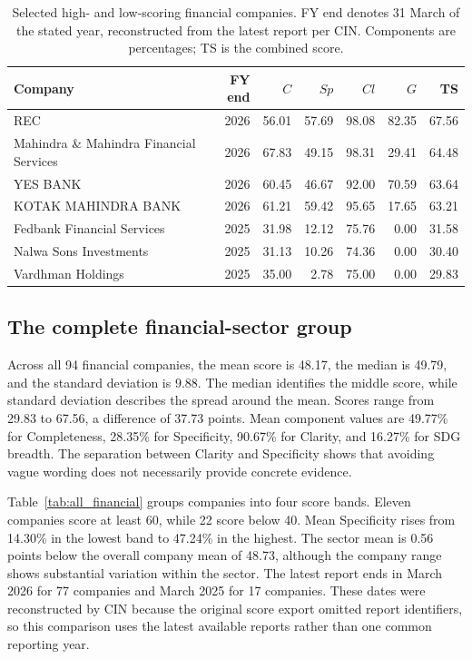\begin{table}[tbp]
\centering\small
\caption{Selected high- and low-scoring financial companies. FY end denotes 31 March of the stated year, reconstructed from the latest report per CIN. Components are percentages; TS is the combined score.}
\label{tab:financial_selected}
\begin{tabularx}{\linewidth}{@{}Yrrrrrr@{}}
\toprule\textbf{Company} & \textbf{FY end} & \textbf{$C$} & \textbf{$Sp$} & \textbf{$Cl$} & \textbf{$G$} & \textbf{TS}\\\midrule
REC & 2026 & 56.01 & 57.69 & 98.08 & 82.35 & 67.56 \\
Mahindra \& Mahindra Financial Services & 2026 & 67.83 & 49.15 & 98.31 & 29.41 & 64.48 \\
YES BANK & 2026 & 60.45 & 46.67 & 92.00 & 70.59 & 63.64 \\
KOTAK MAHINDRA BANK & 2026 & 61.21 & 59.42 & 95.65 & 17.65 & 63.21 \\
Fedbank Financial Services & 2025 & 31.98 & 12.12 & 75.76 & 0.00 & 31.58 \\
Nalwa Sons Investments & 2025 & 31.13 & 10.26 & 74.36 & 0.00 & 30.40 \\
Vardhman Holdings & 2025 & 35.00 & 2.78 & 75.00 & 0.00 & 29.83 \\
\bottomrule
\end{tabularx}
\end{table}

\FloatBarrier
\subsection{The complete financial-sector group}
\label{sec:all_finance}

Across all 94 financial companies, the mean score is 48.17, the median is 49.79, and the standard deviation is 9.88. The median identifies the middle score, while standard deviation describes the spread around the mean. Scores range from 29.83 to 67.56, a difference of 37.73 points. Mean component values are 49.77\% for Completeness, 28.35\% for Specificity, 90.67\% for Clarity, and 16.27\% for SDG breadth. The separation between Clarity and Specificity shows that avoiding vague wording does not necessarily provide concrete evidence.

Table~\ref{tab:all_financial} groups companies into four score bands. Eleven companies score at least 60, while 22 score below 40. Mean Specificity rises from 14.30\% in the lowest band to 47.24\% in the highest. The sector mean is 0.56 points below the overall company mean of 48.73, although the company range shows substantial variation within the sector. The latest report ends in March 2026 for 77 companies and March 2025 for 17 companies. These dates were reconstructed by CIN because the original score export omitted report identifiers, so this comparison uses the latest available reports rather than one common reporting year.

